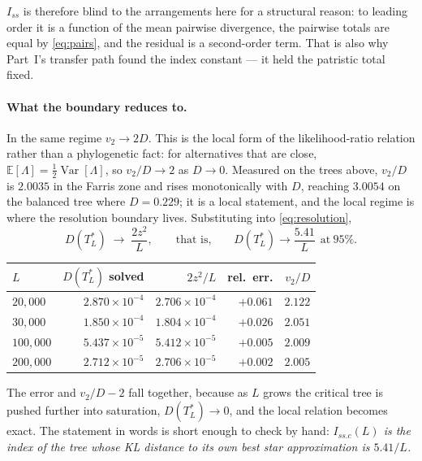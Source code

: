 \documentclass[preprint,12pt,authoryear]{elsarticle}
\newcommand{\Iss}{I_{ss}}
\newcommand{\Issc}{I_{ss.c}}
\newcommand{\E}{\mathbb{E}}
\newcommand{\Var}{\operatorname{Var}}
\newcommand{\TLstar}{T_L^{*}}
\theoremstyle{definition}
\theoremstyle{remark}
\begin{document}
$\Iss$ is therefore blind to the arrangements here for a structural reason:
to leading order it is a function of the mean pairwise divergence, the
pairwise totals are equal by \eqref{eq:pairs}, and the residual is a
second-order term. That is also why Part~I's transfer path found
the index constant --- it held the patristic total fixed.

\paragraph{What the boundary reduces to.} In the same regime $v_2\to2D$.
This is the local form of the likelihood-ratio relation rather than a
phylogenetic fact: for alternatives that are close, $\E[\Lambda]=\frac12
\Var[\Lambda]$, so $v_2/D\to2$ as $D\to0$. Measured on the trees
above, $v_2/D$ is $2.0035$ in the Farris zone and rises monotonically
with $D$, reaching $3.0054$ on the balanced tree where $D=0.229$;
it is a local statement, and the local regime is where the resolution
boundary lives. Substituting into \eqref{eq:resolution},
\begin{equation}
D(\TLstar)\;\longrightarrow\;\frac{2z^2}{L},
\qquad\text{that is,}\qquad
D(\TLstar)\to\frac{5.41}{L}\ \ \text{at}\ 95\% .
\label{eq:critical-delta}
\end{equation}

\begin{center}
\begin{tabular}{lrrrr}
\toprule
$L$ & $D(\TLstar)$ solved & $2z^2/L$ & rel.\ err. & $v_2/D$ \\
\midrule
$20{,}000$  & $2.870\times10^{-4}$ & $2.706\times10^{-4}$ & $+0.061$ & $2.122$ \\
$30{,}000$  & $1.850\times10^{-4}$ & $1.804\times10^{-4}$ & $+0.026$ & $2.051$ \\
$100{,}000$ & $5.437\times10^{-5}$ & $5.412\times10^{-5}$ & $+0.005$ & $2.009$ \\
$200{,}000$ & $2.712\times10^{-5}$ & $2.706\times10^{-5}$ & $+0.002$ & $2.005$ \\
\bottomrule
\end{tabular}
\end{center}

The error and $v_2/D-2$ fall together, because as $L$ grows the critical
tree is pushed further into saturation, $D(\TLstar)\to0$, and the local
relation becomes exact. The statement in words is short enough to check by
hand: \emph{$\Issc(L)$ is the index of the tree whose KL distance to its own
best star approximation is $5.41/L$.}
\end{document}
